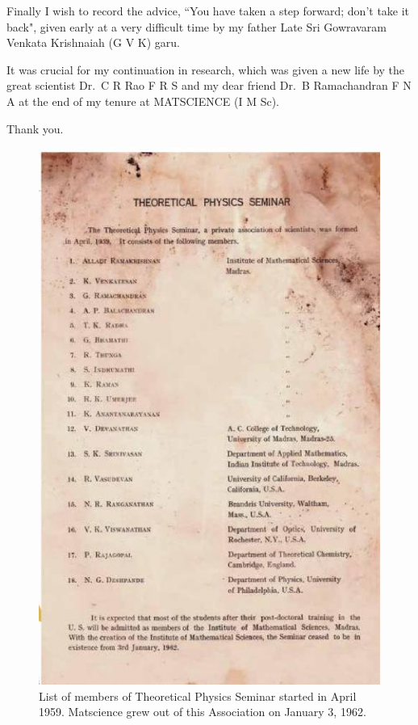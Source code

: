 Finally I wish to record the advice, ``You have taken a step forward; don’t take it
back", given early at a very difficult time by my father Late Sri Gowravaram Venkata
Krishnaiah (G V K) garu.

It was crucial for my continuation in research, which was given a new life by the
great scientist Dr.\ C R Rao F R S and my dear friend Dr.\ B Ramachandran F N A at
the end of my tenure at MATSCIENCE (I M Sc).

\hfill
Thank you.

\begin{figure}[H]
\centering
\includegraphics[scale=0.65]{src/images/chap25/1.eps}
\caption{List of members of Theoretical Physics Seminar started in April 1959. Matscience grew out of
this Association on January 3, 1962.}
\end{figure}

